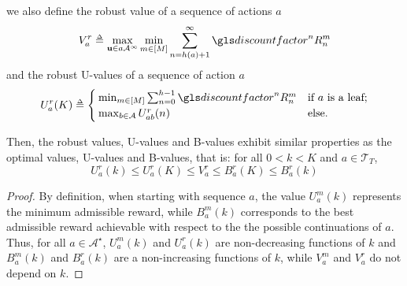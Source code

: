 \begin{subappendices}
\begin{lemma}
\begin{leftbar}[lemmabar]
		we also define the robust value of a sequence of actions $a$
		\begin{equation}
		\label{eq:max_vr}
		V_a^r \eqdef \max_{\bu \in a\mathcal{A^\infty}} \min_{m\in[M]} \sum_{n=h(a)+1}^\infty \discount^n R^m_n
		\end{equation}
		and the robust U-values of a sequence of action $a$
		\begin{equation}
		\label{eq:ur}
		U_a^r(K)  \eqdef
		\begin{cases}
		\min_{m\in[M]} \sum_{n=0}^{h-1} \discount^n R_n^m &\text{if } a \text{ is a leaf;}\\
		\max_{b\in\mathcal{A}} U_{ab}^r(n) & \text{else.}
		\end{cases}
		\end{equation}
		
		Then, the robust values, U-values and B-values exhibit similar properties as the optimal values, U-values and B-values, that is: for all $0 < k < K$ and $a\in\mathcal{T}_T$,
		\begin{equation}
		U^r_a(k) \leq U^r_a(K) \leq V^r_a \leq B^r_a(K) \leq B^r_a(k)
		\end{equation}
		\end{leftbar}
	\end{lemma}
	\begin{proof}
		By definition, when starting with sequence $a$, the value $U_a^m(k)$ represents the minimum admissible reward, while $B_a^m(k)$ corresponds to the best admissible reward achievable with respect to the the possible continuations of $a$. Thus, for all $a\in\mathcal{A}^{\star}$, $U_a^m(k)$ and $U_a^r(k)$ are non-decreasing functions of $k$ and $B_a^m(k)$ and $B_a^r(k)$ are a non-increasing functions of $k$, while $V_a^m$ and $V_a^r$ do not depend on $k$.
		

\end{proof}
\end{subappendices}
